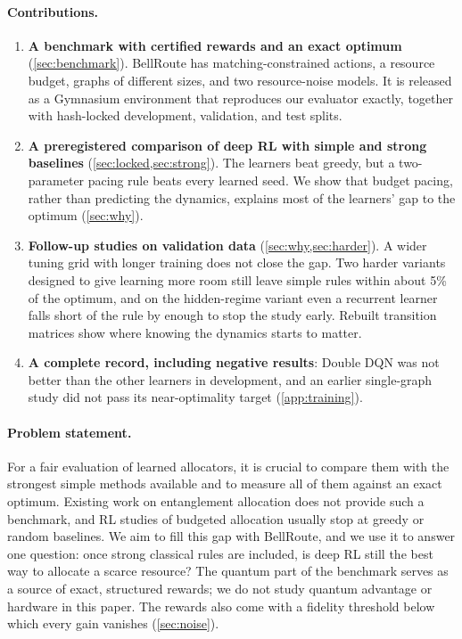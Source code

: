 \documentclass[10pt]{article}
\newcommand{\bellroute}{BellRoute}
\begin{document}
\paragraph{Contributions.}
\begin{enumerate}[leftmargin=*]
  \item \textbf{A benchmark with certified rewards and an exact optimum} (\cref{sec:benchmark}). \bellroute{} has matching-constrained actions, a resource budget, graphs of different sizes, and two resource-noise models. It is released as a Gymnasium environment \citep{towers2024gymnasium} that reproduces our evaluator exactly, together with hash-locked development, validation, and test splits.
  \item \textbf{A preregistered comparison of deep RL with simple and strong baselines} (\cref{sec:locked,sec:strong}). The learners beat greedy, but a two-parameter pacing rule beats every learned seed. We show that budget pacing, rather than predicting the dynamics, explains most of the learners' gap to the optimum (\cref{sec:why}).
  \item \textbf{Follow-up studies on validation data} (\cref{sec:why,sec:harder}). A wider tuning grid with longer training does not close the gap. Two harder variants designed to give learning more room still leave simple rules within about 5\% of the optimum, and on the hidden-regime variant even a recurrent learner falls short of the rule by enough to stop the study early. Rebuilt transition matrices show where knowing the dynamics starts to matter.
  \item \textbf{A complete record, including negative results}: Double DQN was not better than the other learners in development, and an earlier single-graph study did not pass its near-optimality target (\cref{app:training}).
\end{enumerate}

\paragraph{Problem statement.} For a fair evaluation of learned allocators, it is crucial to compare them with the strongest simple methods available and to measure all of them against an exact optimum. Existing work on entanglement allocation does not provide such a benchmark, and RL studies of budgeted allocation usually stop at greedy or random baselines. We aim to fill this gap with \bellroute{}, and we use it to answer one question: once strong classical rules are included, is deep RL still the best way to allocate a scarce resource? The quantum part of the benchmark serves as a source of exact, structured rewards; we do not study quantum advantage or hardware in this paper. The rewards also come with a fidelity threshold below which every gain vanishes (\cref{sec:noise}).
\end{document}
